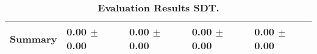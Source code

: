 \begin{table}[htb]
{\begin{tabular}{lllll}
\midrule
\textbf{Summary                                  } &  \phantom{0}0.00 $\pm$ \phantom{0}0.00 &             \phantom{0}0.00 $\pm$ \phantom{0}0.00 &  \phantom{0}0.00 $\pm$ \phantom{0}0.00 &  \phantom{0}0.00 $\pm$ \phantom{0}0.00 \\
\bottomrule
\end{tabular}%
}
\caption{\textbf{Evaluation Results SDT.}}
\label{tab:eval-results}
\end{table}
\newpage 
